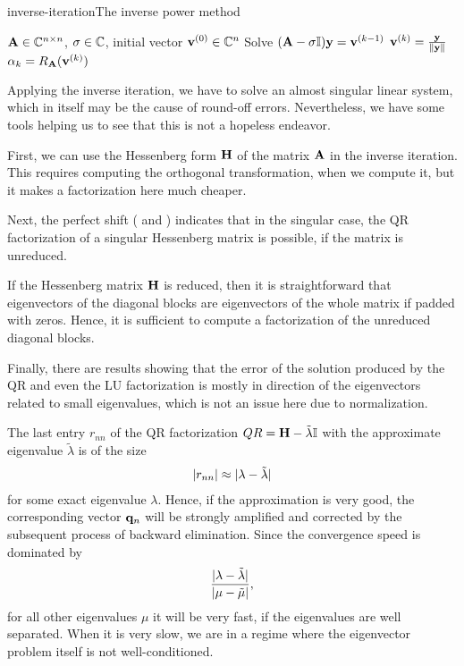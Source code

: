 \begin{Algorithm*}{inverse-iteration}{The inverse power method}
    \begin{algorithmic}[1]
    \Require $\mathbf A\in\mathbb C^{n\times n}$, $\sigma\in\mathbb C$, initial vector $\mathbf v^{(0)}\in\mathbb C^n$
    \State Solve $(\mathbf A-\sigma\mathbb I) \mathbf y = \mathbf v^{(k-1)}$
    \State $\mathbf v^{(k)} = \frac{\mathbf y}{\lVert\mathbf y\rVert}$
    \State $\alpha_k = R_\mathbf A(\mathbf v^{(k)})$
    \EndFor
  \end{algorithmic}
\end{Algorithm*}

\begin{remark}
  Applying the inverse iteration, we have to solve an almost singular
  linear system, which in itself may be the cause of round-off
  errors. Nevertheless, we have some tools helping us to see that this
  is not a hopeless endeavor.

  First, we can use the Hessenberg form $\mathbf H$ of the matrix $\mathbf A$
  in the inverse iteration. This requires computing the orthogonal
  transformation, when we compute it, but it makes a factorization
  here much cheaper.

  Next, the perfect shift ( and
  ) indicates that in the singular
  case, the QR factorization of a singular Hessenberg matrix is
  possible, if the matrix is unreduced.

  If the Hessenberg matrix $\mathbf H$ is reduced, then it is
  straightforward that eigenvectors of the diagonal blocks are
  eigenvectors of the whole matrix if padded with zeros. Hence, it is
  sufficient to compute a factorization of the unreduced diagonal
  blocks.

  Finally, there are results showing that the error of the solution
  produced by the QR and even the LU factorization is mostly in
  direction of the eigenvectors related to small eigenvalues, which is
  not an issue here due to normalization.
\end{remark}

\begin{remark}
  The last entry $r_{nn}$ of the QR factorization
  $QR = \mathbf H-\tilde\lambda\mathbb I$ with the approximate eigenvalue
  $\tilde\lambda$ is of the size
  \begin{gather}
    \lvert r_{nn}\rvert \approx \lvert\lambda-\tilde\lambda\rvert
  \end{gather}
  for some exact eigenvalue $\lambda$. Hence, if the approximation is
  very good, the corresponding vector $\mathbf q_n$ will be strongly
  amplified and corrected by the subsequent process of backward
  elimination. Since the convergence speed is dominated by
  \begin{gather}
    \frac{\lvert\lambda-\tilde\lambda\rvert}{\lvert\mu-\tilde\mu\rvert},
  \end{gather}
  for all other eigenvalues $\mu$ it will be very fast, if the
  eigenvalues are well separated. When it is very slow, we are in a
  regime where the eigenvector problem itself is not well-conditioned.
\end{remark}
